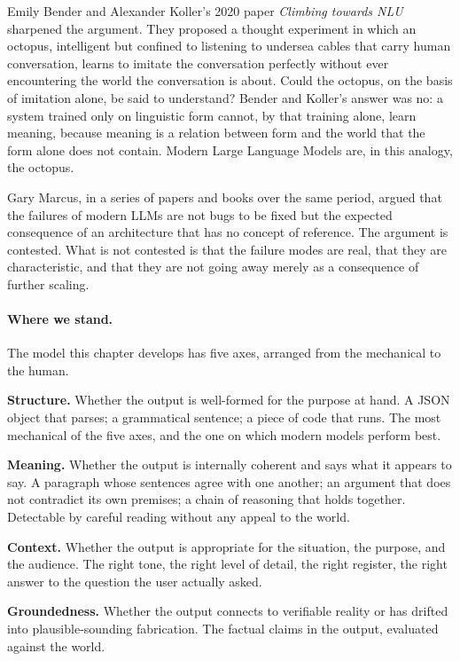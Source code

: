 Emily Bender and Alexander Koller's 2020 paper \emph{Climbing
towards NLU} sharpened the argument. They proposed a thought
experiment in which an octopus, intelligent but confined to
listening to undersea cables that carry human conversation,
learns to imitate the conversation perfectly without ever
encountering the world the conversation is about. Could the
octopus, on the basis of imitation alone, be said to
understand? Bender and Koller's answer was no: a system
trained only on linguistic form cannot, by that training
alone, learn meaning, because meaning is a relation between
form and the world that the form alone does not contain.
Modern Large Language Models are, in this analogy, the
octopus.

Gary Marcus, in a series of papers and books over the same
period, argued that the failures of modern LLMs are not bugs
to be fixed but the expected consequence of an architecture
that has no concept of reference. The argument is contested.
What is not contested is that the failure modes are real,
that they are characteristic, and that they are not going
away merely as a consequence of further scaling.

\paragraph{Where we stand.} The model this chapter develops has five axes, arranged from
the mechanical to the human.

\textbf{Structure.} Whether the output is well-formed for the
purpose at hand. A JSON object that parses; a grammatical
sentence; a piece of code that runs. The most mechanical of
the five axes, and the one on which modern models perform
best.

\textbf{Meaning.} Whether the output is internally coherent
and says what it appears to say. A paragraph whose sentences
agree with one another; an argument that does not contradict
its own premises; a chain of reasoning that holds together.
Detectable by careful reading without any appeal to the
world.

\textbf{Context.} Whether the output is appropriate for the
situation, the purpose, and the audience. The right tone, the
right level of detail, the right register, the right answer
to the question the user actually asked.

\textbf{Groundedness.} Whether the output connects to verifiable
reality or has drifted into plausible-sounding fabrication.
The factual claims in the output, evaluated against the
world.

